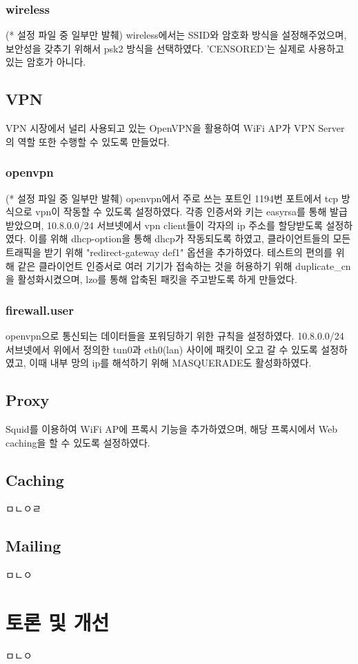 \documentclass{article}
\begin{document}
    \subsubsection{wireless}
    (* 설정 파일 중 일부만 발췌) wireless에서는 SSID와 암호화 방식을 설정해주었으며, 보안성을 갖추기 위해서 psk2 방식을 선택하였다. 'CENSORED'는 실제로 사용하고 있는 암호가 아니다.



    \subsection{VPN}
     VPN 시장에서 널리 사용되고 있는 OpenVPN을 활용하여 WiFi AP가 VPN Server의 역할 또한 수행할 수 있도록 만들었다.
    \subsubsection{openvpn}
    (* 설정 파일 중 일부만 발췌) openvpn에서 주로 쓰는 포트인 1194번 포트에서 tcp 방식으로 vpn이 작동할 수 있도록 설정하였다.
    각종 인증서와 키는 easyrsa를 통해 발급받았으며, 10.8.0.0/24 서브넷에서 vpn client들이 각자의 ip 주소를 할당받도록 설정하였다.
    이를 위해 dhcp-option을 통해 dhcp가 작동되도록 하였고, 클라이언트들의 모든 트래픽을 받기 위해 "redirect-gateway def1" 옵션을 추가하였다.
    테스트의 편의를 위해 같은 클라이언트 인증서로 여러 기기가 접속하는 것을 허용하기 위해 duplicate\_cn을 활성화시켰으며, lzo를 통해 압축된 패킷을 주고받도록 하게 만들었다.
    \subsubsection{firewall.user}
    openvpn으로 통신되는 데이터들을 포워딩하기 위한 규칙을 설정하였다. 10.8.0.0/24 서브넷에서 위에서 정의한 tun0과 eth0(lan) 사이에 패킷이 오고 갈 수 있도록 설정하였고,
    이때 내부 망의 ip를 해석하기 위해 MASQUERADE도 활성화하였다.

    \subsection{Proxy}
     Squid를 이용하여 WiFi AP에 프록시 기능을 추가하였으며, 해당 프록시에서 Web caching을 할 수 있도록 설정하였다.
    \

    \subsection{Caching}
    ㅁㄴㅇㄹ
    \subsection{Mailing}
    ㅁㄴㅇ

    \section{토론 및 개선}
    ㅁㄴㅇ
\end{document}
